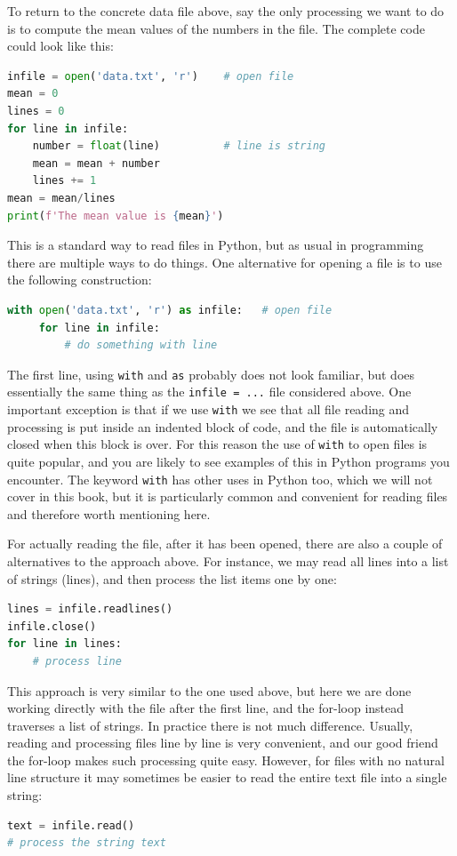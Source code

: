 \documentclass[graybox,envcountchap,sectrefs,final]{svmonodo}
\begin{document}
To return to the concrete data file above, say the only processing we want to do is to compute the mean values of the
numbers in the file. The complete code could look like this:
\begin{lstlisting}[language=Python,style=blue1bar]
infile = open('data.txt', 'r')    # open file
mean = 0
lines = 0
for line in infile:
    number = float(line)          # line is string
    mean = mean + number
    lines += 1
mean = mean/lines
print(f'The mean value is {mean}')
\end{lstlisting}
This is a standard way to read files in Python, but as usual in programming there are multiple ways to do things.
One alternative for opening a file is to use the following construction:
\begin{lstlisting}[language=Python,style=blue1]
with open('data.txt', 'r') as infile:   # open file
     for line in infile:
     	 # do something with line
\end{lstlisting}
The first line, using \texttt{with} and \texttt{as} probably does not look familiar, but does essentially the same thing as the
\texttt{infile = ...} file considered above. One important exception is that if we use \texttt{with} we see that all file reading and processing
is put inside an indented block of code, and the file is automatically closed when this block is over. For this reason
the use of \texttt{with} to open files is quite popular, and you are likely to see examples of this in Python programs you encounter.
The keyword \texttt{with} has other uses in Python too, which we will not cover in this book, but it is particularly common and
convenient for reading files and therefore worth mentioning here.

For actually reading the file, after it has been opened, there are also a couple of alternatives to the approach above.
For instance,
we may read all lines into a list of strings (lines), and then process the list items one by one:
\begin{lstlisting}[language=Python,style=blue1]
lines = infile.readlines()
infile.close()
for line in lines:
    # process line
\end{lstlisting}
This approach is very similar to the one used above, but here we are done working directly with the file after the first line,
and the for-loop instead traverses a list of strings. In practice there is not much difference. Usually, reading and
processing files line by line is very convenient, and our good friend the for-loop makes such processing quite easy. However,
for files with no natural line structure it may sometimes be easier to read the entire text file into a single string:
\begin{lstlisting}[language=Python,style=blue1]
text = infile.read()
# process the string text
\end{lstlisting}
\end{document}
